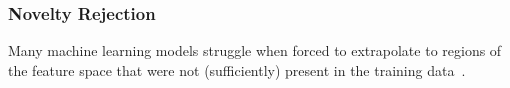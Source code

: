 



\subsubsection{Novelty Rejection}
Many machine learning models struggle when forced to extrapolate to regions of the feature space that were not (sufficiently) present in the training data~.

